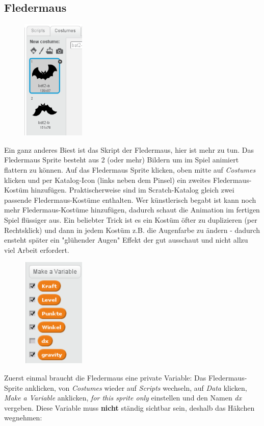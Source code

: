 \subsection*{Fledermaus}
\begin{figure}
\includegraphics[width=3cm]{scratch/animation.png}
\end{figure}
Ein ganz anderes Biest ist das Skript der Fledermaus, hier ist mehr zu tun. Das Fledermaus Sprite besteht aus 2 (oder mehr) Bildern um im Spiel animiert flattern zu können. Auf das Fledermaus Sprite klicken, oben mitte auf \textit{Costumes} klicken und per Katalog-Icon (links neben dem Pinsel) ein zweites Fledermaus-Kostüm hinzufügen. Praktischerweise sind im Scratch-Katalog gleich zwei passende Fledermaus-Kostüme enthalten. Wer künstlerisch begabt ist kann noch mehr Fledermaus-Kostüme hinzufügen, dadurch schaut die Animation im fertigen Spiel flüssiger aus. Ein beliebter Trick ist es ein Kostüm öfter zu duplizieren (per Rechtsklick) und dann in jedem Kostüm z.B. die Augenfarbe zu ändern - dadurch ensteht später ein "glühender Augen" Effekt der gut ausschaut und nicht allzu viel Arbeit erfordert. 

\begin{figure}
\includegraphics[width=3cm]{scratch/fbatvars.png}
\end{figure}
Zuerst einmal braucht die Fledermaus eine private Variable: Das Fledermaus-Sprite anklicken, von \textit{Costumes} wieder auf \textit{Scripts} wechseln,  auf \textit{Data} klicken, \textit{Make a Variable} anklicken, \textit{for this sprite only} einstellen und den Namen \textit{dx} vergeben. Diese Variable muss \textbf{nicht} ständig sichtbar sein, deshalb das Häkchen wegnehmen:


